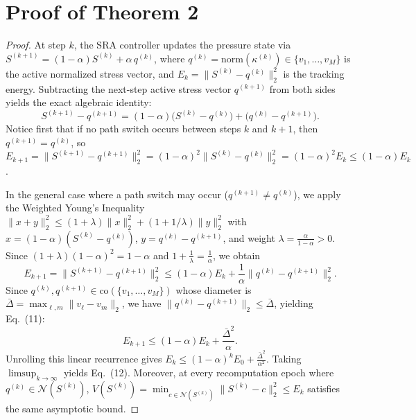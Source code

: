\documentclass[11pt]{article}
\newcommand{\rev}[1]{#1}
\newenvironment{IEEEproof}{\begin{proof}}{\end{proof}}
\begin{document}
\section{Proof of Theorem 2}
\label{app:proof_thm_drop_jump}
\begin{IEEEproof}
\rev{At step $k$, the SRA controller updates the pressure state via $S^{(k+1)} = (1-\alpha)S^{(k)} + \alpha\,q^{(k)}$, where $q^{(k)} = \mathrm{norm}(\kappa^{(k)}) \in \{v_1,\dots,v_M\}$ is the active normalized stress vector, and $E_k = \|S^{(k)} - q^{(k)}\|_2^2$ is the tracking energy. Subtracting the next-step active stress vector $q^{(k+1)}$ from both sides yields the exact algebraic identity:
\begin{equation}
S^{(k+1)} - q^{(k+1)} = (1-\alpha)\big(S^{(k)} - q^{(k)}\big) + \big(q^{(k)} - q^{(k+1)}\big).
\end{equation}
Notice first that if no path switch occurs between steps $k$ and $k+1$, then $q^{(k+1)} = q^{(k)}$, so $E_{k+1} = \|S^{(k+1)} - q^{(k+1)}\|_2^2 = (1-\alpha)^2 \|S^{(k)} - q^{(k)}\|_2^2 = (1-\alpha)^2 E_k \le (1-\alpha)E_k$.

In the general case where a path switch may occur ($q^{(k+1)} \neq q^{(k)}$), we apply the Weighted Young's Inequality $\|x+y\|_2^2 \le (1+\lambda)\|x\|_2^2 + (1+1/\lambda)\|y\|_2^2$ with $x = (1-\alpha)(S^{(k)}-q^{(k)})$, $y = q^{(k)} - q^{(k+1)}$, and weight $\lambda = \frac{\alpha}{1-\alpha} > 0$. Since $(1+\lambda)(1-\alpha)^2 = 1-\alpha$ and $1 + \frac{1}{\lambda} = \frac{1}{\alpha}$, we obtain
\begin{equation}
E_{k+1} = \|S^{(k+1)} - q^{(k+1)}\|_2^2 \le (1-\alpha)E_k + \frac{1}{\alpha}\|q^{(k)} - q^{(k+1)}\|_2^2.
\end{equation}
Since $q^{(k)}, q^{(k+1)} \in \mathrm{co}(\{v_1, \dots, v_M\})$ whose diameter is $\bar{\Delta} = \max_{\ell,m}\|v_\ell - v_m\|_2$, we have $\|q^{(k)} - q^{(k+1)}\|_2 \le \bar{\Delta}$, yielding Eq.~(11):
\begin{equation}
E_{k+1} \le (1-\alpha)E_k + \frac{\bar{\Delta}^2}{\alpha}.
\end{equation}
Unrolling this linear recurrence gives $E_k \le (1-\alpha)^k E_0 + \frac{\bar{\Delta}^2}{\alpha^2}$. Taking $\limsup_{k\to\infty}$ yields Eq.~(12). Moreover, at every recomputation epoch where $q^{(k)} \in \mathcal{N}(S^{(k)})$, $V(S^{(k)}) = \min_{c \in \mathcal{N}(S^{(k)})}\|S^{(k)} - c\|_2^2 \le E_k$ satisfies the same asymptotic bound.}
\end{IEEEproof}
\end{document}
